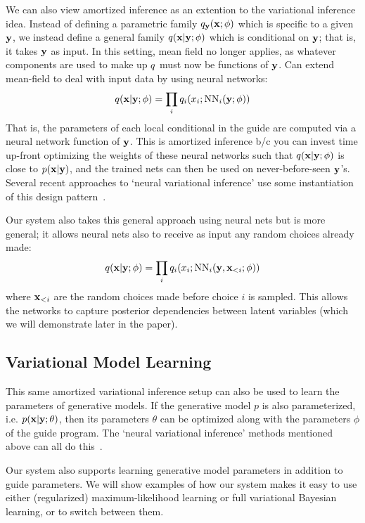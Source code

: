 We can also view amortized inference as an extention to the variational inference idea.
Instead of defining a parametric family $q_{\mathbf{y}}(\mathbf{x} ; \phi)$ which is specific to a given $\mathbf{y}$, we instead define a general family $q(\mathbf{x} | \mathbf{y} ; \phi)$ which is conditional on $\mathbf{y}$; that is, it takes $\mathbf{y}$ as input.
In this setting, mean field no longer applies, as whatever components are used to make up $q$ must now be functions of $\mathbf{y}$.
Can extend mean-field to deal with input data by using neural networks:
\begin{equation*}
q(\mathbf{x} | \mathbf{y} ; \phi) = \prod_i q_i(x_i ; \text{NN}_i(\mathbf{y} ; \phi))
\end{equation*}
That is, the parameters of each local conditional in the guide are computed via a neural network function of $\mathbf{y}$.
This is amortized inference b/c you can invest time up-front optimizing the weights of these neural networks such that $q(\mathbf{x} | \mathbf{y} ; \phi)$ is close to $p(\mathbf{x} | \mathbf{y})$, and the trained nets can then be used on never-before-seen $\mathbf{y}$'s.
Several recent approaches to `neural variational inference' use some instantiation of this design pattern~\cite{NVIL,DLGM,AEVB}.

Our system also takes this general approach using neural nets but is more general; it allows neural nets also to receive as input any random choices already made:
\begin{equation*}
q(\mathbf{x} | \mathbf{y} ; \phi) = \prod_i q_i(x_i ; \text{NN}_i(\mathbf{y}, \mathbf{x}_{<i} ; \phi))
\end{equation*}
where $\mathbf{x}_{<i}$ are the random choices made before choice $i$ is sampled. This allows the networks to capture posterior dependencies between latent variables (which we will demonstrate later in the paper).

\subsection{Variational Model Learning}

This same amortized variational inference setup can also be used to learn the parameters of generative models. If the generative model $p$ is also parameterized, i.e. $p(\mathbf{x} | \mathbf{y} ; \theta)$, then its parameters $\theta$ can be optimized along with the parameters $\phi$ of the guide program.
The `neural variational inference' methods mentioned above can all do this~\cite{NVIL,DLGM,AEVB}.

Our system also supports learning generative model parameters in addition to guide parameters.
We will show examples of how our system makes it easy to use either (regularized) maximum-likelihood learning or full variational Bayesian learning, or to switch between them.

